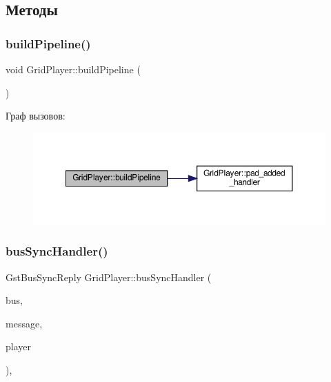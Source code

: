 \subsection{Методы}
\mbox{\label{class_grid_player_a435af1383c7f936d6db8cee26fef4df4}} 
\subsubsection{\texorpdfstring{build\+Pipeline()}{buildPipeline()}}
{\footnotesize\ttfamily void Grid\+Player\+::build\+Pipeline (\begin{DoxyParamCaption}{ }\end{DoxyParamCaption})\hspace{0.3cm}{\ttfamily [private]}}

Граф вызовов\+:\nopagebreak
\begin{figure}[H]
\begin{center}
\leavevmode
\includegraphics[width=350pt]{class_grid_player_a435af1383c7f936d6db8cee26fef4df4_cgraph}
\end{center}
\end{figure}
\mbox{\label{class_grid_player_a6c10419eae272fa948b2b6391d923e4a}} 
\subsubsection{\texorpdfstring{bus\+Sync\+Handler()}{busSyncHandler()}}
{\footnotesize\ttfamily Gst\+Bus\+Sync\+Reply Grid\+Player\+::bus\+Sync\+Handler (\begin{DoxyParamCaption}\item[{Gst\+Bus $\ast$}]{bus,  }\item[{Gst\+Message $\ast$}]{message,  }\item[{\hyperlink{class_grid_player}{Grid\+Player} $\ast$}]{player }\end{DoxyParamCaption})\hspace{0.3cm}{\ttfamily [static]}, {\ttfamily [private]}}


